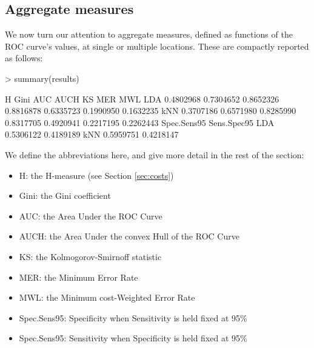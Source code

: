 \documentclass{article}
\begin{document}
\subsection{Aggregate measures}\label{sec:aggregate}
We now turn our attention to aggregate measures, defined as functions of the ROC curve's values, at single or multiple locations. These are compactly reported as follows: 
\begin{Schunk}
\begin{Sinput}
> summary(results)
\end{Sinput}
\begin{Soutput}
            H      Gini       AUC      AUCH        KS       MER       MWL
LDA 0.4802968 0.7304652 0.8652326 0.8816878 0.6335723 0.1990950 0.1632235
kNN 0.3707186 0.6571980 0.8285990 0.8317705 0.4920941 0.2217195 0.2262443
    Spec.Sens95 Sens.Spec95
LDA   0.5306122   0.4189189
kNN   0.5959751   0.4218147
\end{Soutput}
\end{Schunk}
We define the abbreviations here, and give more detail in the rest of the section: 
\begin{itemize}
\item H: the H-measure (see Section \ref{sec:costs})
\item Gini: the Gini coefficient
\item AUC: the Area Under the ROC Curve
\item AUCH: the Area Under the convex Hull of the ROC Curve
\item KS: the Kolmogorov-Smirnoff statistic
\item MER: the Minimum Error Rate
\item MWL: the Minimum cost-Weighted Error Rate
\item Spec.Sens95: Specificity when Sensitivity is held fixed at 95\%
\item Spec.Sens95: Sensitivity when Specificity is held fixed at 95\%
\end{itemize}
\end{document}
